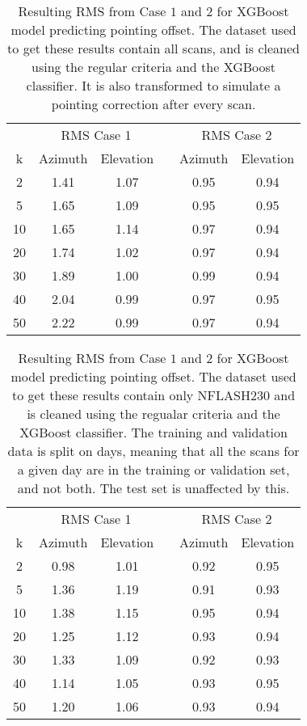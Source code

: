 \begin{table}[h]
    \centering %
    \caption{Resulting RMS from Case $1$ and $2$ for XGBoost model predicting pointing offset.
    The dataset used to get these results contain all scans, and is cleaned using the regular criteria and the XGBoost classifier.
    It is also transformed to simulate a pointing correction after every scan.}
    \begin{tabular}{ccc c cc}
        \toprule
        \multicolumn{1}{c}{} & \multicolumn{2}{c}{RMS Case 1} & & \multicolumn{2}{c}{RMS Case 2} \\
        \cmidrule(lr){2-3} \cmidrule(lr){5-6}
        k & Azimuth & Elevation & & Azimuth & Elevation \\
        \midrule
         2 &  1.41 & 1.07 & & 0.95 &  0.94 \\
         5 &  1.65 & 1.09 & & 0.95 &  0.95 \\
        10 &  1.65 & 1.14 & & 0.97 &  0.94 \\
        20 &  1.74 & 1.02 & & 0.97 &  0.94 \\
        30 &  1.89 & 1.00 & & 0.99 &  0.94 \\
        40 &  2.04 & 0.99 & & 0.97 &  0.95 \\
        50 &  2.22 & 0.99 & & 0.97 &  0.94 \\
    \bottomrule
\end{tabular}
\end{table}
\begin{table}[h]
    \centering %
    \caption{Resulting RMS from Case $1$ and $2$ for XGBoost model predicting pointing offset.
    The dataset used to get these results contain only NFLASH230 and is cleaned using the regualar criteria and the XGBoost classifier.
    The training and validation data is split on days, meaning that all the scans for a given day
    are in the training or validation set, and not both. The test set is unaffected by this.}
    \begin{tabular}{ccc c cc}
        \toprule
        \multicolumn{1}{c}{} & \multicolumn{2}{c}{RMS Case 1} & & \multicolumn{2}{c}{RMS Case 2} \\
        \cmidrule(lr){2-3} \cmidrule(lr){5-6}
         k & Azimuth & Elevation & & Azimuth & Elevation \\
        \midrule
         2 &  0.98 & 1.01 & & 0.92 &  0.95 \\
         5 &  1.36 & 1.19 & & 0.91 &  0.93 \\
        10 &  1.38 & 1.15 & & 0.95 &  0.94 \\
        20 &  1.25 & 1.12 & & 0.93 &  0.94 \\
        30 &  1.33 & 1.09 & & 0.92 &  0.93 \\
        40 &  1.14 & 1.05 & & 0.93 &  0.95 \\
        50 &  1.20 & 1.06 & & 0.93 &  0.94 \\
        \bottomrule
    \end{tabular}
\end{table}


